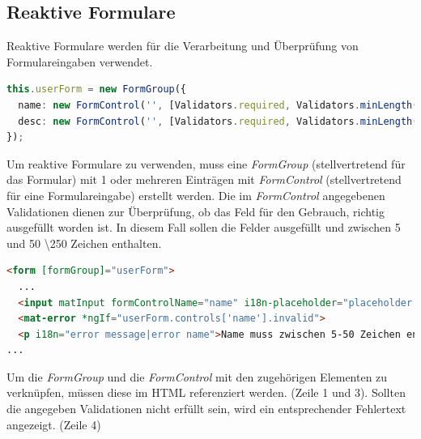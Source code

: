 \subsection{Reaktive Formulare}
Reaktive Formulare werden für die Verarbeitung und Überprüfung von Formulareingaben verwendet.
\newline
\newline
\begin{lstlisting}[language=TypeScript, caption=Formularüberprüfung mit reakitven Formularen TypeScript, label=lst:Formularüberprüfung]
this.userForm = new FormGroup({
  name: new FormControl('', [Validators.required, Validators.minLength(5), Validators.maxLength(50)]),
  desc: new FormControl('', [Validators.required, Validators.minLength(5), Validators.maxLength(250)])
});
\end{lstlisting}
Um reaktive Formulare zu verwenden, muss eine \textit{FormGroup} (stellvertretend für das Formular) mit 1 oder mehreren 
Einträgen mit \textit{FormControl} (stellvertretend für eine Formulareingabe) erstellt werden. Die im \textit{FormControl} angegebenen Validationen dienen
zur Überprüfung, ob das Feld für den Gebrauch, richtig ausgefüllt worden ist. In diesem Fall sollen die Felder ausgefüllt und zwischen 5 und 50 \textbackslash  250 Zeichen enthalten.

\begin{lstlisting}[language=html, caption=Formularüberprüfung mit reakitven Formularen HTML, label=lst:impl:foo]
<form [formGroup]="userForm">
  ...
  <input matInput formControlName="name" i18n-placeholder="placeholder text|placeholder for questionnaire name" placeholder="Umfragename eingeben" name="questinnairename" [(ngModel)]="this.questionnaire.name" required>   
  <mat-error *ngIf="userForm.controls['name'].invalid">
  <p i18n="error message|error name">Name muss zwischen 5-50 Zeichen enthalten.</p>
...
\end{lstlisting}

Um die \textit{FormGroup} und die \textit{FormControl} mit den zugehörigen Elementen zu verknüpfen, müssen diese im HTML 
referenziert werden. (Zeile 1 und 3). Sollten die angegeben Validationen nicht erfüllt sein, wird ein entsprechender Fehlertext angezeigt. (Zeile 4)

